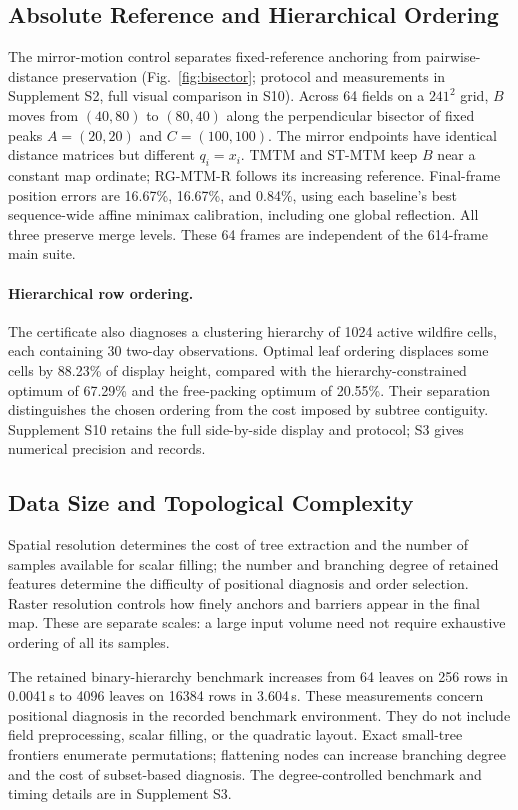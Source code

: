 \subsection{Absolute Reference and Hierarchical Ordering}\label{sec:reference_control}

The mirror-motion control separates fixed-reference anchoring from pairwise-distance preservation (Fig.~\ref{fig:bisector}; protocol and measurements in Supplement S2, full visual comparison in S10). Across 64 fields on a $241^2$ grid, $B$ moves from $(40,80)$ to $(80,40)$ along the perpendicular bisector of fixed peaks $A=(20,20)$ and $C=(100,100)$. The mirror endpoints have identical distance matrices but different $q_i=x_i$. TMTM and ST-MTM keep $B$ near a constant map ordinate; RG-MTM-R follows its increasing reference. Final-frame position errors are 16.67\%, 16.67\%, and 0.84\%, using each baseline's best sequence-wide affine minimax calibration, including one global reflection. All three preserve merge levels. These 64 frames are independent of the 614-frame main suite.

\paragraph{Hierarchical row ordering.}
The certificate also diagnoses a clustering hierarchy of 1024 active wildfire cells, each containing 30 two-day observations. Optimal leaf ordering displaces some cells by 88.23\% of display height, compared with the hierarchy-constrained optimum of 67.29\% and the free-packing optimum of 20.55\%. Their separation distinguishes the chosen ordering from the cost imposed by subtree contiguity. Supplement S10 retains the full side-by-side display and protocol; S3 gives numerical precision and records.

\subsection{Data Size and Topological Complexity}
Spatial resolution determines the cost of tree extraction and the number of samples available for scalar filling; the number and branching degree of retained features determine the difficulty of positional diagnosis and order selection. Raster resolution controls how finely anchors and barriers appear in the final map. These are separate scales: a large input volume need not require exhaustive ordering of all its samples.

The retained binary-hierarchy benchmark increases from 64 leaves on 256 rows in 0.0041\,s to 4096 leaves on 16384 rows in 3.604\,s. These measurements concern positional diagnosis in the recorded benchmark environment. They do not include field preprocessing, scalar filling, or the quadratic layout. Exact small-tree frontiers enumerate permutations; flattening nodes can increase branching degree and the cost of subset-based diagnosis. The degree-controlled benchmark and timing details are in Supplement S3.

